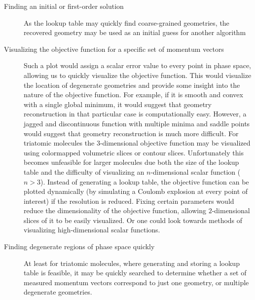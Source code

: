 \begin{description}
  \item [Finding an initial or first-order solution] As the lookup table may quickly find coarse-grained geometries, the recovered geometry may be used as an initial guess for another algorithm 
  \item [Visualizing the objective function for a specific set of momentum vectors] Such a plot would assign a scalar error value to every point in phase space, allowing us to quickly visualize the objective function. This would visualize the location of degenerate geometries and provide some insight into the nature of the objective function. For example, if it is smooth and convex with a single global minimum, it would suggest that geometry reconstruction in that particular case is computationally easy. However, a jagged and discontinuous function with multiple minima and saddle points would suggest that geometry reconstruction is much more difficult. For triatomic molecules the $3$-dimensional objective function may be visualized using colormapped volumetric slices or contour slices. Unfortunately this becomes unfeasible for larger molecules due both the size of the lookup table and the difficulty of visualizing an $n$-dimensional scalar function ($n>3$). Instead of generating a lookup table, the objective function can be plotted dynamically (by simulating a Coulomb explosion at every point of interest) if the resolution is reduced. Fixing certain parameters would reduce the dimensionality of the objective function, allowing $2$-dimensional slices of it to be easily visualized. Or one could look towards methods of visualizing high-dimensional scalar functions.
  \item [Finding degenerate regions of phase space quickly] At least for triatomic molecules, where generating and storing a lookup table is feasible, it may be quickly searched to determine whether a set of measured momentum vectors correspond to just one geometry, or multiple degenerate geometries. 
\end{description}

